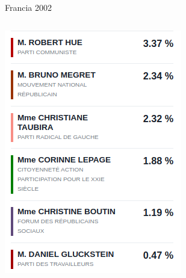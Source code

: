 \documentclass[bigger]{beamer}
\begin{document}
\begin{frame}[label={sec:org158fa54}]{Francia 2002}
\begin{columns}
\begin{column}{0.33\columnwidth}
\includegraphics[width=\textwidth]{./pics/f3.png}
\end{column}
\begin{column}{0.33\columnwidth}

\end{column}
\end{columns}
\end{frame}
\end{document}
